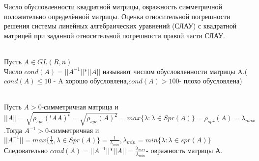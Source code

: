 \documentclass[__main__.tex]{subfiles}
\begin{document}
Число обусловленности квадратной матрицы, овражность симметричной положительно определённой матрицы. Оценка относительной погрешности решения системы линейных алгебраических уравнений (СЛАУ) с квадратной матрицей при заданной относительной погрешности правой части СЛАУ.

\begin{definition}\\
	Пусть $A\in GL(R,n)$\\
	Число $cond(A)=\vert\vert A^{-1} \vert\vert *\vert\vert A \vert\vert $ называют числом обусловленности матрицы A.($cond(A)\leq 10$ - A хорошо обусловлена,$cond(A)>100$- плохо обусловлена)\\
\end{definition}
	
\begin{definition}\\
	Пусть $A>0$-симметричная матрица и $\vert\vert A \vert\vert= \sqrt{\rho_{spr}(^tAA)^t}=\sqrt{\rho_{spr}(A)^2}=max\lbrace\lambda:\lambda\in Spr(A)\rbrace=\rho_{spr}(A)=\lambda_{max}$.Тогда $A^{-1}>0$-симметричная и $\vert\vert A^{-1} \vert\vert=max\lbrace\frac{1}{\lambda},\lambda \in Spr(A)\rbrace=\frac{1}{\lambda_{min}}, \lambda_{min}=min\lbrace\lambda:\lambda \in spr(A)\rbrace$\\
	Следовательно $cond(A)=\vert\vert A^{-1} \vert\vert *\vert\vert A \vert\vert=\frac{\lambda_{max}}{\lambda_{min}} $- овражность матрицы А.\\
\end{definition}
\end{document}
